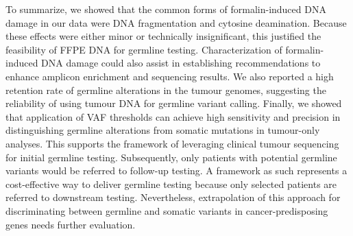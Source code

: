 To summarize, we showed that the common forms of formalin-induced DNA damage in our data were DNA fragmentation and cytosine deamination. Because these effects were either minor or technically insignificant, this justified the feasibility of FFPE DNA for germline testing. Characterization of formalin-induced DNA damage could also assist in establishing recommendations to enhance amplicon enrichment and sequencing results. We also reported a high retention rate of germline alterations in the tumour genomes, suggesting the reliability of using tumour DNA for germline variant calling. Finally, we showed that application of VAF thresholds can achieve high sensitivity and precision in distinguishing germline alterations from somatic mutations in tumour-only analyses. This supports the framework of leveraging clinical tumour sequencing for initial germline testing. Subsequently, only patients with potential germline variants would be referred to follow-up testing. A framework as such represents a cost-effective way to deliver germline testing because only selected patients are referred to downstream testing. Nevertheless, extrapolation of this approach for discriminating between germline and somatic variants in cancer-predisposing genes needs further evaluation.
